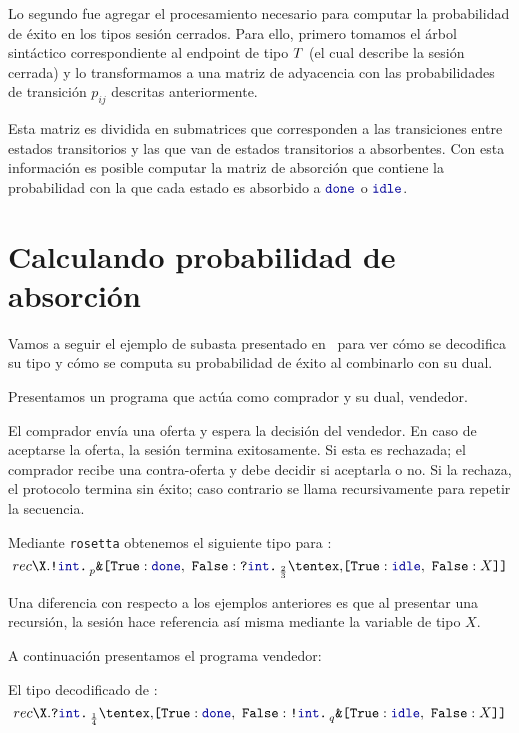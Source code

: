 Lo segundo fue agregar el procesamiento necesario para computar la probabilidad
de éxito en los tipos sesión cerrados. Para ello, primero tomamos el árbol
sintáctico correspondiente al endpoint de tipo $T$ (el cual describe
la sesión cerrada) y lo transformamos a una matriz de adyacencia con las
probabilidades de transición $p_{ij}$ descritas anteriormente.

Esta matriz es dividida en submatrices que corresponden a las transiciones
entre estados transitorios y las que van de estados transitorios a absorbentes.
Con esta información es posible computar la matriz de absorción que contiene la
probabilidad con la que cada estado es absorbido a $\Done$ o $\Idle$.

\section{Calculando probabilidad de absorción}

Vamos a seguir el ejemplo de subasta presentado
en~\cite{DBLP:conf/concur/InversoMPTT20} para ver cómo se decodifica su tipo y
cómo se computa su probabilidad de éxito al combinarlo con su dual.

Presentamos un programa que actúa como comprador y su dual, vendedor.

\AuctionBuyer

El comprador envía una oferta y espera la decisión del vendedor. En caso de
aceptarse la oferta, la sesión termina exitosamente. Si esta es rechazada; el
comprador recibe una contra-oferta y debe decidir si aceptarla o no. Si la
rechaza, el protocolo termina sin éxito; caso contrario se llama recursivamente
para repetir la secuencia.

Mediante \texttt{rosetta} obtenemos el siguiente tipo para :
\begin{equation*}
	rec\X.\Out\tint\BinaryPBranch[p]{\Done}{\In\tint\BinaryPChoice[\frac{2}{3}]{\Idle}{X}}
\end{equation*}

Una diferencia con respecto a los ejemplos anteriores es que al presentar una
recursión, la sesión hace referencia así misma mediante la variable de tipo $X$.

A continuación presentamos el programa vendedor:

\AuctionSeller

El tipo decodificado de :
\begin{equation*}
	rec\X.\In\tint\BinaryPChoice[\frac{1}{4}]{\Done}{\Out\tint\BinaryPBranch[q]{\Idle}{X}}
\end{equation*}

